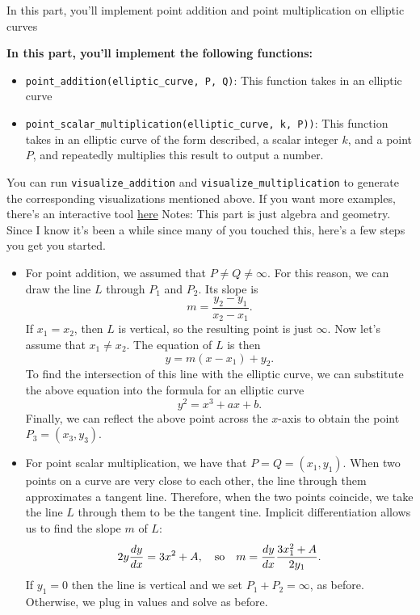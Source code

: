 \documentclass{article}
\begin{document}
\begin{tcolorbox}
    In this part, you'll implement point addition and point multiplication on elliptic curves

    
    \textbf{In this part, you'll implement the following functions:}
    \begin{itemize}
        \item \lstinline{point_addition(elliptic_curve, P, Q)}: This function takes in an elliptic curve 
        \item \lstinline{point_scalar_multiplication(elliptic_curve, k, P))}: This function takes in an elliptic curve of the form described, a scalar integer $k$, and a point $P$, and repeatedly multiplies this result to output a number.
    \end{itemize}
    You can run \lstinline{visualize_addition} and \lstinline{visualize_multiplication} to generate the corresponding visualizations mentioned above. If you want more examples, there's an interactive tool \href{https://andrea.corbellini.name/ecc/interactive/reals-add.html}{here}
    Notes: This part is just algebra and geometry. Since I know it's been a while since many of you touched this, here's a few steps you get you started.
    \begin{itemize}
        \item For point addition, we assumed that $P \ne Q \ne \infty$. For this reason, we can draw the line $L$ through $P_{1}$ and $P_{2}$. Its slope is $$m = \frac{y_{2} - y_{1}}{x_{2} - x_{1}}.$$ If $x_{1} = x_{2}$, then $L$ is vertical, so the resulting point is just $\infty$. Now let's assume that $x_{1} \ne x_{2}$. The equation of $L$ is then $$y = m(x - x_{1}) + y_{2}.$$ To find the intersection of this line with the elliptic curve, we can substitute the above equation into the formula for an elliptic curve $$y^{2} = x^{3} + ax + b.$$ Finally, we can reflect the above point across the $x$-axis to obtain the point $P_{3} = (x_{3}, y_{3})$.
        \item For point scalar multiplication, we have that $P = Q = (x_{1}, y_{1})$. When two points on a curve are very close to each other, the line through them approximates a tangent line. Therefore, when the two points coincide, we take the line $L$ through them to be the tangent tine. Implicit differentiation allows us to find the slope $m$ of $L$: $$2y \frac{dy}{dx} = 3x^{2} + A,\text{\quad so\quad} m = \frac{dy}{dx}\frac{3x_{1}^{2} + A}{2y_{1}}.$$ If $y_{1} = 0$ then the line is vertical and we set $P_{1} + P_{2} = \infty$, as before. Otherwise, we plug in values and solve as before.
    \end{itemize}
    
\end{tcolorbox}
\end{document}
